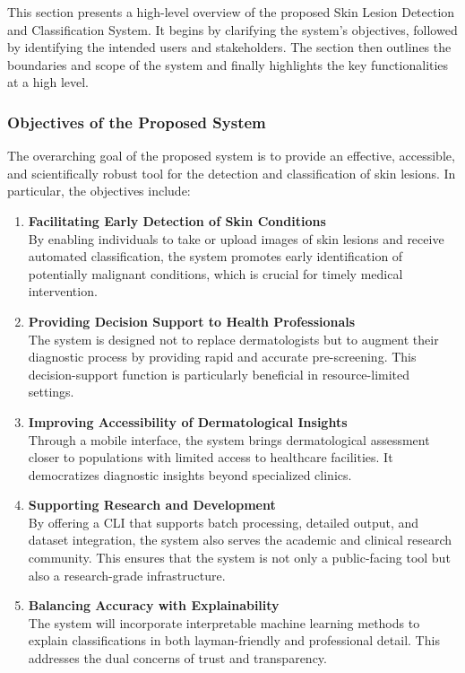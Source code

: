 \documentclass[
  12pt,
  oneside]{article}
\begin{document}
This section presents a high-level overview of the proposed Skin Lesion
Detection and Classification System. It begins by clarifying the
system's objectives, followed by identifying the intended users and
stakeholders. The section then outlines the boundaries and scope of the
system and finally highlights the key functionalities at a high level.

\subsubsection{Objectives of the Proposed
System}\label{objectives-of-the-proposed-system}

The overarching goal of the proposed system is to provide an effective,
accessible, and scientifically robust tool for the detection and
classification of skin lesions. In particular, the objectives include:

\begin{enumerate}
\def\labelenumi{\arabic{enumi}.}
\item
  \textbf{Facilitating Early Detection of Skin Conditions}\\
  By enabling individuals to take or upload images of skin lesions and
  receive automated classification, the system promotes early
  identification of potentially malignant conditions, which is crucial
  for timely medical intervention.
\item
  \textbf{Providing Decision Support to Health Professionals}\\
  The system is designed not to replace dermatologists but to augment
  their diagnostic process by providing rapid and accurate
  pre-screening. This decision-support function is particularly
  beneficial in resource-limited settings.
\item
  \textbf{Improving Accessibility of Dermatological Insights}\\
  Through a mobile interface, the system brings dermatological
  assessment closer to populations with limited access to healthcare
  facilities. It democratizes diagnostic insights beyond specialized
  clinics.
\item
  \textbf{Supporting Research and Development}\\
  By offering a CLI that supports batch processing, detailed output, and
  dataset integration, the system also serves the academic and clinical
  research community. This ensures that the system is not only a
  public-facing tool but also a research-grade infrastructure.
\item
  \textbf{Balancing Accuracy with Explainability}\\
  The system will incorporate interpretable machine learning methods to
  explain classifications in both layman-friendly and professional
  detail. This addresses the dual concerns of trust and transparency.
\end{enumerate}
\end{document}
